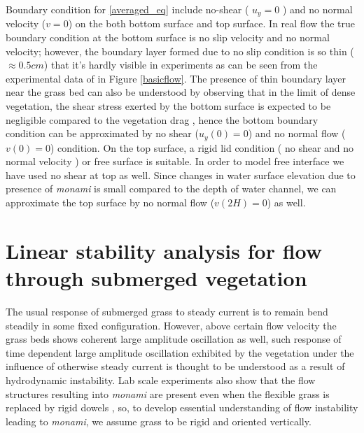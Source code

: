 \documentclass[12pt]{report}   %
\newcommand{\monami}{\textit{monami}}
\begin{document}
Boundary condition for \eqref{averaged_eq} include no-shear ( $u_y=0$ ) and no normal velocity ($v=0$) on the both bottom surface and top surface.
In real flow the true boundary condition at the bottom surface is no slip velocity and no normal velocity; however, the boundary layer formed due to no slip condition is so thin ($\approx 0.5 cm$) that it's hardly visible in experiments as can be seen from the experimental data of \cite{Nepf04} in Figure \ref{basicflow}. The presence of thin boundary layer near the grass bed can also be understood by observing that in the limit of dense vegetation, the shear stress exerted by the bottom surface is expected to be negligible compared to the vegetation drag \cite{Nepf04}, hence the bottom boundary condition can be approximated by no shear ($u_y(0)=0$) and no normal flow ($v(0)=0$) condition.
On the top surface, a rigid lid condition ( no shear and no normal velocity ) or free surface is suitable. In order to model free interface we have used no shear at top as well. Since changes in water surface elevation due to presence of {\monami}  is small compared to the depth of water channel, we can approximate the top surface by no normal flow ($v(2H)=0$) as well.  %
%
\clearpage{\pagestyle{empty}\cleardoublepage}
\chapter{Linear stability analysis for flow through submerged vegetation}
The usual response of submerged grass to steady current is to remain bend steadily in some fixed configuration. However, above certain flow velocity the grass beds shows coherent large amplitude oscillation as well, such response of time dependent large amplitude oscillation exhibited by the vegetation under the influence of otherwise steady current is thought to be understood as a result of hydrodynamic instability. Lab scale experiments also show that the flow structures resulting into {\monami} are present even when the flexible grass is replaced by rigid dowels \cite{Ghisal02,Nepf04}, so, to develop essential understanding of flow instability leading to {\monami}, we assume grass to be rigid and oriented vertically. 
\end{document}
